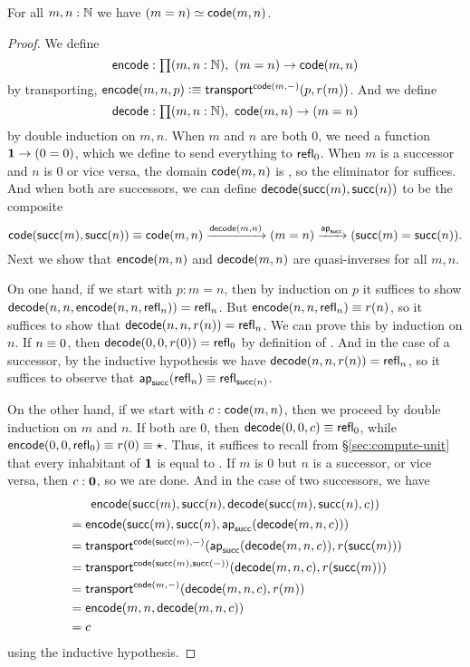 \begin{thm}\label{thm:path-nat}
  For all $m,n:\mathbb{N}$ we have $(m=n) \simeq \mathsf{code}(m,n)$.
\end{thm}
\begin{proof}
  We define
  \[ \encode : \prd{m,n:\N} (m=n) \to \code(m,n) \]
  by transporting, $\mathsf{encode}(m,n,p) \vcentcolon\equiv \mathsf{transport}^{\mathsf{code}(m,-)}(p,r(m))$.
  And we define
  \[ \decode : \prd{m,n:\N} \code(m,n) \to (m=n) \]
  by double induction on $m,n$.
  When $m$ and $n$ are both $0$, we need a function $\mathbf{1} \to (0=0)$, which we define to send everything to $\mathsf{refl}_{0}$.
  When $m$ is a successor and $n$ is $0$ or vice versa, the domain $\mathsf{code}(m,n)$ is \emptyt, so the eliminator for \emptyt suffices.
  And when both are successors, we can define $\mathsf{decode}(\mathsf{succ}(m),\mathsf{succ}(n))$ to be the composite
  \[ \mathsf{code}(\mathsf{succ}(m),\mathsf{succ}(n))\equiv\mathsf{code}(m,n) \xrightarrow{\mathsf{decode}(m,n)} (m=n) \xrightarrow{\mathsf{ap}_{\mathsf{succ}}} (\mathsf{succ}(m)=\mathsf{succ}(n)). \]
  Next we show that $\mathsf{encode}(m,n)$ and $\mathsf{decode}(m,n)$ are quasi-inverses for all $m,n$.

  On one hand, if we start with $p:m=n$, then by induction on $p$ it suffices to show $\mathsf{decode}(n,n,\mathsf{encode}(n,n,\mathsf{refl}_{n}))=\mathsf{refl}_{n}$.
  But $\mathsf{encode}(n,n,\mathsf{refl}_{n}) \equiv r(n)$, so it suffices to show that $\mathsf{decode}(n,n,r(n)) =\mathsf{refl}_{n}$.
  We can prove this by induction on $n$.
  If $n\equiv 0$, then $\mathsf{decode}(0,0,r(0)) =\mathsf{refl}_{0}$ by definition of \decode.
  And in the case of a successor, by the inductive hypothesis we have $\mathsf{decode}(n,n,r(n)) = \mathsf{refl}_{n}$, so it suffices to observe that $\mathsf{ap}_{\mathsf{succ}}(\mathsf{refl}_{n}) \equiv \mathsf{refl}_{\mathsf{succ}(n)}$.

  On the other hand, if we start with $c:\mathsf{code}(m,n)$, then we proceed by double induction on $m$ and $n$.
  If both are $0$, then $\mathsf{decode}(0,0,c) \equiv \mathsf{refl}_{0}$, while $\mathsf{encode}(0,0,\mathsf{refl}_{0})\equiv r(0) \equiv \star$.
  Thus, it suffices to recall from \S\ref{sec:compute-unit} that every inhabitant of $\mathbf{1}$ is equal to \ttt.
  If $m$ is $0$ but $n$ is a successor, or vice versa, then $c:\mathbf{0}$, so we are done.
  And in the case of two successors, we have
  \begin{multline*}
    \mathsf{encode}(\mathsf{succ}(m),\mathsf{succ}(n),\mathsf{decode}(\mathsf{succ}(m),\mathsf{succ}(n),c))\\
    \begin{split}
    &= \mathsf{encode}(\mathsf{succ}(m),\mathsf{succ}(n),\mathsf{ap}_{\mathsf{succ}}(\mathsf{decode}(m,n,c)))\\
    &= \mathsf{transport}^{\mathsf{code}(\mathsf{succ}(m),-)}(\mathsf{ap}_{\mathsf{succ}}(\mathsf{decode}(m,n,c)),r(\mathsf{succ}(m)))\\
    &= \mathsf{transport}^{\mathsf{code}(\mathsf{succ}(m),\mathsf{succ}(-))}(\mathsf{decode}(m,n,c),r(\mathsf{succ}(m)))\\
    &= \mathsf{transport}^{\mathsf{code}(m,-)}(\mathsf{decode}(m,n,c),r(m))\\
    &= \mathsf{encode}(m,n,\mathsf{decode}(m,n,c))\\
    &= c
  \end{split}
  \end{multline*}
  using the inductive hypothesis.
\end{proof}

